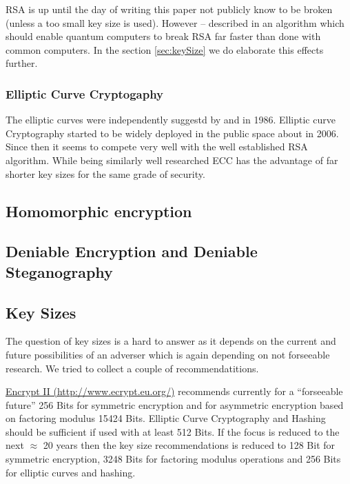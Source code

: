 RSA is up until the day of writing this paper not publicly know to be broken (unless a too small key size is used). However -- \citeauthor{Shor97polynomial-timealgorithms} described in \citeyear{Shor97polynomial-timealgorithms} an algorithm which should enable quantum computers to break RSA far faster than done with common computers. In the section \ref{sec:keySize} we do elaborate this effects further.

\subsubsection{Elliptic Curve Cryptogaphy}
The elliptic curves were independently suggestd by \cite{Miller1986} and \cite{Koblitz04guideto} in 1986. Elliptic curve Cryptography started to be widely deployed in the public space about in 2006. Since then it seems to compete very well with the well established RSA algorithm. While being similarly well researched ECC has the advantage of far shorter key sizes for the same grade of security.

\subsection{Homomorphic encryption}
\cite{Gentry:2009:FHE:1536414.1536440}

\subsection{Deniable Encryption and Deniable Steganography}

\subsection{Key Sizes\label{sec:keySize}}
The question of key sizes is a hard to answer as it depends on the current and future possibilities of an adverser which is again depending on not forseeable research. We tried to collect a couple of recommendatitions.

\href{http://www.ecrypt.eu.org/}{Encrypt II (http://www.ecrypt.eu.org/)} recommends currently for a ``forseeable future'' 256 Bits for symmetric encryption and for asymmetric encryption based on factoring modulus 15424 Bits. Elliptic Curve Cryptography and Hashing should be sufficient if used with at least 512 Bits. If the focus is reduced to the next $\approx$ 20 years then the key size recommendations is reduced to 128 Bit for symmetric encryption, 3248 Bits for factoring modulus operations and 256 Bits for elliptic curves and hashing.

